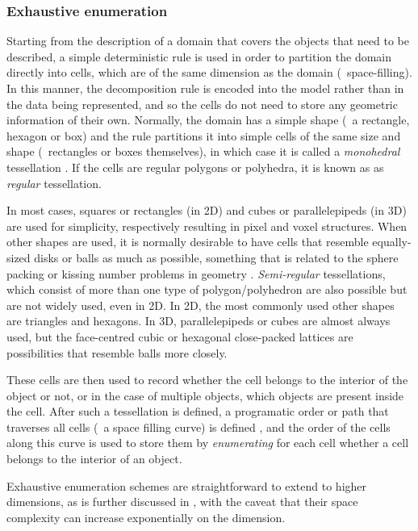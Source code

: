 \subsubsection{Exhaustive enumeration}

Starting from the description of a domain that covers the objects that need to be described, a simple deterministic rule is used in order to partition the domain directly into cells, which are of the same dimension as the domain (\ie\ space-filling).
In this manner, the decomposition rule is encoded into the model rather than in the data being represented, and so the cells do not need to store any geometric information of their own.
Normally, the domain has a simple shape (\eg\ a rectangle, hexagon or box) \citep[\S{}6.8]{ISO19123:2007} and the rule partitions it into simple cells of the same size and shape (\eg\ rectangles or boxes themselves), in which case it is called a \emph{monohedral} tessellation \citep{Boots99}.
If the cells are regular polygons or polyhedra, it is known as as \emph{regular} tessellation.

In most cases, squares or rectangles (in 2D) and cubes or parallelepipeds (in 3D) are used for simplicity, respectively resulting in pixel and voxel structures.
When other shapes are used, it is normally desirable to have cells that resemble equally-sized disks or balls as much as possible, something that is related to the sphere packing or kissing number problems in geometry \citep{Conway92}.
\emph{Semi-regular} tessellations, which consist of more than one type of polygon/polyhedron are also possible but are not widely used, even in 2D.
In 2D, the most commonly used other shapes are triangles and hexagons.
In 3D, parallelepipeds or cubes are almost always used, but the face-centred cubic or hexagonal close-packed lattices are possibilities that resemble balls more closely.

These cells are then used to record whether the cell belongs to the interior of the object or not, or in the case of multiple objects, which objects are present inside the cell.
After such a tessellation is defined, a programatic order or path that traverses all cells (\ie\ a space filling curve) is defined \citep{Sagan94}, and the order of the cells along this curve is used to store them by \emph{enumerating} for each cell whether a cell belongs to the interior of an object.

Exhaustive enumeration schemes are straightforward to extend to higher dimensions, as is further discussed in , with the caveat that their space complexity can increase exponentially on the dimension.

